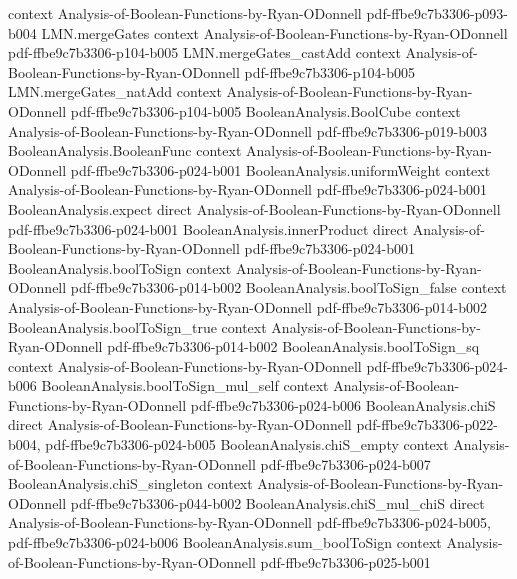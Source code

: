 \begin{lemma}
  {context}
  {Analysis-of-Boolean-Functions-by-Ryan-ODonnell}
  {pdf-ffbe9c7b3306-p093-b004}
\proofstep
  {LMN.mergeGates}
  {context}
  {Analysis-of-Boolean-Functions-by-Ryan-ODonnell}
  {pdf-ffbe9c7b3306-p104-b005}
\proofstep
  {LMN.mergeGates_castAdd}
  {context}
  {Analysis-of-Boolean-Functions-by-Ryan-ODonnell}
  {pdf-ffbe9c7b3306-p104-b005}
\proofstep
  {LMN.mergeGates_natAdd}
  {context}
  {Analysis-of-Boolean-Functions-by-Ryan-ODonnell}
  {pdf-ffbe9c7b3306-p104-b005}
\proofstep
  {BooleanAnalysis.BoolCube}
  {context}
  {Analysis-of-Boolean-Functions-by-Ryan-ODonnell}
  {pdf-ffbe9c7b3306-p019-b003}
\proofstep
  {BooleanAnalysis.BooleanFunc}
  {context}
  {Analysis-of-Boolean-Functions-by-Ryan-ODonnell}
  {pdf-ffbe9c7b3306-p024-b001}
\proofstep
  {BooleanAnalysis.uniformWeight}
  {context}
  {Analysis-of-Boolean-Functions-by-Ryan-ODonnell}
  {pdf-ffbe9c7b3306-p024-b001}
\proofstep
  {BooleanAnalysis.expect}
  {direct}
  {Analysis-of-Boolean-Functions-by-Ryan-ODonnell}
  {pdf-ffbe9c7b3306-p024-b001}
\proofstep
  {BooleanAnalysis.innerProduct}
  {direct}
  {Analysis-of-Boolean-Functions-by-Ryan-ODonnell}
  {pdf-ffbe9c7b3306-p024-b001}
\proofstep
  {BooleanAnalysis.boolToSign}
  {context}
  {Analysis-of-Boolean-Functions-by-Ryan-ODonnell}
  {pdf-ffbe9c7b3306-p014-b002}
\proofstep
  {BooleanAnalysis.boolToSign_false}
  {context}
  {Analysis-of-Boolean-Functions-by-Ryan-ODonnell}
  {pdf-ffbe9c7b3306-p014-b002}
\proofstep
  {BooleanAnalysis.boolToSign_true}
  {context}
  {Analysis-of-Boolean-Functions-by-Ryan-ODonnell}
  {pdf-ffbe9c7b3306-p014-b002}
\proofstep
  {BooleanAnalysis.boolToSign_sq}
  {context}
  {Analysis-of-Boolean-Functions-by-Ryan-ODonnell}
  {pdf-ffbe9c7b3306-p024-b006}
\proofstep
  {BooleanAnalysis.boolToSign_mul_self}
  {context}
  {Analysis-of-Boolean-Functions-by-Ryan-ODonnell}
  {pdf-ffbe9c7b3306-p024-b006}
\proofstep
  {BooleanAnalysis.chiS}
  {direct}
  {Analysis-of-Boolean-Functions-by-Ryan-ODonnell}
  {pdf-ffbe9c7b3306-p022-b004,
    pdf-ffbe9c7b3306-p024-b005}
\proofstep
  {BooleanAnalysis.chiS_empty}
  {context}
  {Analysis-of-Boolean-Functions-by-Ryan-ODonnell}
  {pdf-ffbe9c7b3306-p024-b007}
\proofstep
  {BooleanAnalysis.chiS_singleton}
  {context}
  {Analysis-of-Boolean-Functions-by-Ryan-ODonnell}
  {pdf-ffbe9c7b3306-p044-b002}
\proofstep
  {BooleanAnalysis.chiS_mul_chiS}
  {direct}
  {Analysis-of-Boolean-Functions-by-Ryan-ODonnell}
  {pdf-ffbe9c7b3306-p024-b005,
    pdf-ffbe9c7b3306-p024-b006}
\proofstep
  {BooleanAnalysis.sum_boolToSign}
  {context}
  {Analysis-of-Boolean-Functions-by-Ryan-ODonnell}
  {pdf-ffbe9c7b3306-p025-b001}

\end{lemma}

